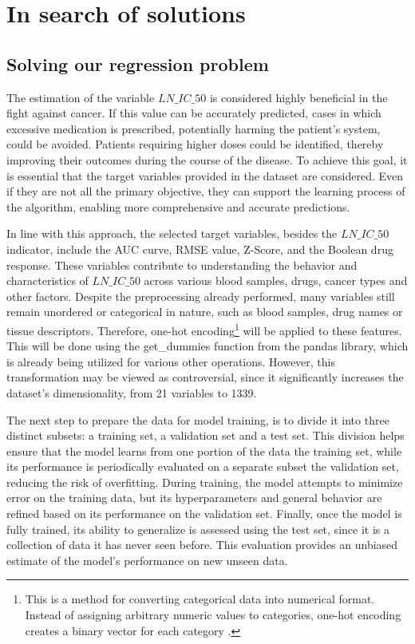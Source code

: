 \chapter{In search of solutions}\label{cap:diseño}

\section{Solving our regression problem}

The estimation of the variable \(LN\_IC\_{50}\) is considered highly beneficial in the fight against cancer. If this value can be accurately predicted, cases in which excessive medication is prescribed, potentially harming the patient's system, could be avoided. Patients requiring higher doses could be identified, thereby improving their outcomes during the course of the disease. To achieve this goal, it is essential that the target variables provided in the dataset are considered. Even if they are not all the primary objective, they can support the learning process of the algorithm, enabling more comprehensive and accurate predictions.

In line with this approach, the selected target variables, besides the \(LN\_IC\_{50}\) indicator, include the AUC curve, RMSE value, Z-Score, and the Boolean drug response. These variables contribute to understanding the behavior and characteristics of \(LN\_IC\_{50}\) across various blood samples, drugs, cancer types and other factors. Despite the preprocessing already performed, many variables still remain unordered or categorical in nature, such as blood samples, drug names or tissue descriptors. Therefore, one-hot encoding\footnote{This is a method for converting categorical data into numerical format. Instead of assigning arbitrary numeric values to categories, one-hot encoding creates a binary vector for each category \cite{amit2024onehot}.} will be applied to these features. This will be done using the get\_dummies function from the pandas library, which is already being utilized for various other operations. However, this transformation may be viewed as controversial, since it significantly increases the dataset's dimensionality, from 21 variables to 1339.

The next step to prepare the data for model training, is to divide it into three distinct subsets: a training set, a validation set and a test set. This division helps ensure that the model learns from one portion of the data the training set, while its performance is periodically evaluated on a separate subset the validation set, reducing the risk of overfitting. During training, the model attempts to minimize error on the training data, but its hyperparameters and general behavior are refined based on its performance on the validation set. Finally, once the model is fully trained, its ability to generalize is assessed using the test set, since it is a collection of data it has never seen before. This evaluation provides an unbiased estimate of the model's performance on new unseen data.

